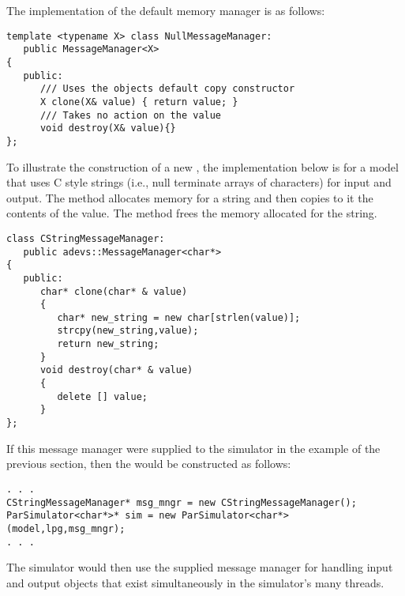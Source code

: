 The implementation of the default memory manager is as follows:
\begin{verbatim}
template <typename X> class NullMessageManager:
   public MessageManager<X>
{
   public:
      /// Uses the objects default copy constructor
      X clone(X& value) { return value; }
      /// Takes no action on the value
      void destroy(X& value){}
};
\end{verbatim}
To illustrate the construction of a new , the implementation below is for a model that uses C style strings (i.e., null terminate arrays of characters) for input and output. The  method allocates memory for a string and then copies to it the contents of the value. The  method frees the memory allocated for the string.
\begin{verbatim}
class CStringMessageManager:
   public adevs::MessageManager<char*>
{
   public:
      char* clone(char* & value)
      {
         char* new_string = new char[strlen(value)];
         strcpy(new_string,value);
         return new_string;
      }
      void destroy(char* & value)
      {
         delete [] value;
      }
};
\end{verbatim}
If this message manager were supplied to the simulator in the example of the previous section, then the  would be constructed as follows:
\begin{verbatim}
. . .
CStringMessageManager* msg_mngr = new CStringMessageManager();
ParSimulator<char*>* sim = new ParSimulator<char*>(model,lpg,msg_mngr);
. . .
\end{verbatim}
The simulator would then use the supplied message manager for handling input and output objects that exist simultaneously in the simulator's many threads.

